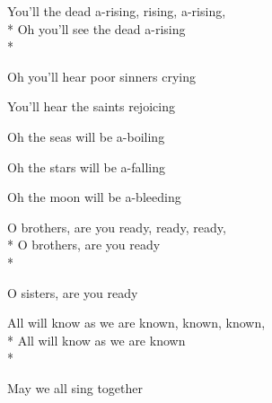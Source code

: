
\contd
{}

\versemark
You’ll the dead a-rising, rising, a-rising,\\*
Oh you’ll see the dead a-rising\\*
\vin{}



\versemark
Oh you’ll hear poor sinners crying\simile

\versemark
You’ll hear the saints rejoicing\simile

\versemark
Oh the seas will be a-boiling\simile

\versemark
Oh the stars will be a-falling\simile

\versemark
Oh the moon will be a-bleeding\simile

\versemark
O brothers, are you ready, ready, ready,\\*
O brothers, are you ready\\*
\vin{}

\versemark
O sisters, are you ready\simile

\versemark
All will know as we are known, known, known,\\*
All will know as we are known\\*
\vin{}

\versemark
May we all sing together\simile


